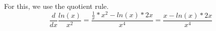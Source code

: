 For this, we use the quotient rule.
$$
\frac{d}{dx}\frac{ln(x)}{x^2}=\frac{\frac{1}{x}*x^2-ln(x)*2x}{x^4} = \frac{x-ln(x)*2x}{x^4}
$$